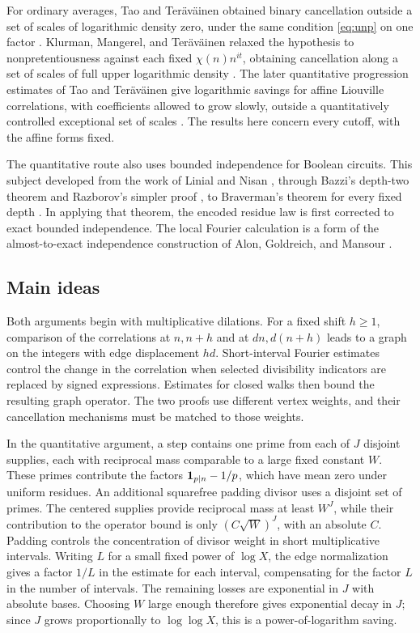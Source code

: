 For ordinary averages,
Tao and Ter\"av\"ainen obtained binary cancellation outside
a set of scales of logarithmic density zero, under the same
condition \eqref{eq:unp} on one factor
\cite[Corollary~1.13]{TT19}. Klurman, Mangerel, and Ter\"av\"ainen
relaxed the hypothesis to nonpretentiousness against each fixed
\(\chi(n)n^{it}\),
obtaining cancellation along a set of scales of full upper logarithmic
density \cite[Theorem~1.2]{KMT23}. The later quantitative progression
estimates of Tao and Ter\"av\"ainen
give logarithmic savings for affine Liouville correlations,
with coefficients allowed to grow slowly, outside a quantitatively
controlled exceptional set of scales
\cite[Theorem~3.1 and Remarks~3.2]{TT26}. The results here concern
every cutoff, with the affine forms fixed.

The quantitative route also uses bounded independence for Boolean
circuits. This subject developed from the work of Linial and Nisan
\cite{LinialNisan90}, through Bazzi's depth-two theorem and
Razborov's simpler proof \cite{Bazzi09,Razborov08}, to Braverman's
theorem for every fixed depth \cite{Braverman10}. In applying that theorem, the
encoded residue law is first corrected to exact bounded independence.
The local Fourier calculation is a form of the almost-to-exact
independence construction of Alon, Goldreich, and Mansour
\cite[Theorem~2.1 and Section~3.1]{AGM03}.

\subsection{Main ideas}

Both arguments begin with multiplicative dilations. For a fixed
shift $h\ge1$, comparison of the correlations at $n,n+h$ and at
$dn,d(n+h)$ leads to a graph on the integers with edge displacement
$hd$. Short-interval Fourier estimates control the change in the
correlation when selected divisibility indicators are replaced by
signed expressions. Estimates for closed walks then bound the resulting
graph operator. The two proofs use different vertex weights, and their
cancellation mechanisms must be matched to those weights.

In the quantitative argument, a step contains one prime from each of
$J$ disjoint supplies, each with reciprocal mass comparable to a large
fixed constant $W$. These primes contribute the factors
$\mathbf 1_{p\mid n}-1/p$, which have mean zero under uniform residues.
An additional squarefree padding divisor uses a disjoint set of primes.
The centered supplies provide reciprocal mass at least $W^J$, while
their contribution to the operator bound is only $(C\sqrt W)^J$, with
an absolute $C$. Padding controls the concentration
of divisor weight in short multiplicative intervals. Writing $L$ for
a small fixed power of $\log X$, the edge normalization gives a factor
$1/L$ in the estimate for each interval, compensating for the factor
$L$ in the number of intervals. The remaining losses are exponential
in $J$ with absolute bases. Choosing $W$ large enough therefore gives
exponential decay in $J$; since $J$ grows proportionally to
$\log\log X$, this is a power-of-logarithm saving.

